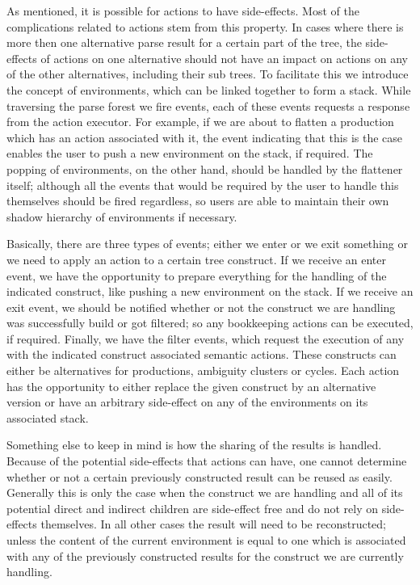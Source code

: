 \documentclass[a4paper,10pt]{article}
\begin{document}
As mentioned, it is possible for actions to have side-effects. Most of the complications related to actions stem from this property. In cases where there is more then one alternative parse result for a certain part of the tree, the side-effects of actions on one alternative should not have an impact on actions on any of the other alternatives, including their sub trees. To facilitate this we introduce the concept of environments, which can be linked together to form a stack. While traversing the parse forest we fire events, each of these events requests a response from the action executor. For example, if we are about to flatten a production which has an action associated with it, the event indicating that this is the case enables the user to push a new environment on the stack, if required. The popping of environments, on the other hand, should be handled by the flattener itself; although all the events that would be required by the user to handle this themselves should be fired regardless, so users are able to maintain their own shadow hierarchy of environments if necessary.

Basically, there are three types of events; either we enter or we exit something or we need to apply an action to a certain tree construct. If we receive an enter event, we have the opportunity to prepare everything for the handling of the indicated construct, like pushing a new environment on the stack. If we receive an exit event, we should be notified whether or not the construct we are handling was successfully build or got filtered; so any bookkeeping actions can be executed, if required. Finally, we have the filter events, which request the execution of any with the indicated construct associated semantic actions. These constructs can either be alternatives for productions, ambiguity clusters or cycles. Each action has the opportunity to either replace the given construct by an alternative version or have an arbitrary side-effect on any of the environments on its associated stack.

Something else to keep in mind is how the sharing of the results is handled. Because of the potential side-effects that actions can have, one cannot determine whether or not a certain previously constructed result can be reused as easily. Generally this is only the case when the construct we are handling and all of its potential direct and indirect children are side-effect free and do not rely on side-effects themselves. In all other cases the result will need to be reconstructed; unless the content of the current environment is equal to one which is associated with any of the previously constructed results for the construct we are currently handling.
\end{document}
